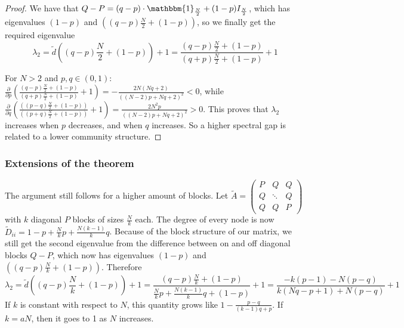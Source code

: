\begin{proof}
We have that $Q - P 
= (q - p)\cdot\mathbbm{1}_{\frac{N}{2}} + (1-p) I_{\frac{N}{2}}$, which has eigenvalues $(1-p)$ and $((q - p)\frac{N}{2}+(1-p))$, so we finally get the required eigenvalue $$\lambda_2 = \tilde{d}((q - p)\frac{N}{2}+(1-p)) + 1
= \frac{(q - p)\frac{N}{2} + (1-p)}{(q + p)\frac{N}{2} + (1-p)} + 1$$

For $N > 2$ and $p,q\in(0,1)$: $\frac{\partial}{\partial p}\left(\frac{(q - p)\frac{N}{2} + (1-p)}{(q + p)\frac{N}{2} + (1-p)} + 1\right) = 
-\frac{2N(Nq + 2)}{\left((N - 2)p + Nq + 2\right)^2} < 0$, while 
$\frac{\partial}{\partial q}\left(\frac{\left(  (p - q)\frac{N}{2} + (1-p)\right)}{\left( (p + q)\frac{ N}{2} + (1-p)\right)} + 1\right) 
= 
\frac{2 N^2 p}{\left((N - 2) p + N q + 2\right)^2} > 0
$. This proves that $\lambda_2$ increases when $p$ decreases, and when $q$ increases. So a higher spectral gap is related to a lower community structure.
\end{proof} 

\subsubsection{Extensions of the theorem}

The argument still follows for a higher amount of blocks. Let $\tilde{A}=\begin{pmatrix}
    P&Q&Q\\Q&\ddots&Q\\Q&Q&P
\end{pmatrix}$ with $k$ diagonal $P$ blocks of sizes $\frac{N}{k}$ each. The degree of every node is now $\tilde{D}_{ii}=1-p+\frac{N}{k}p+\frac{N(k-1)}{k}q$. Because of the block structure of our matrix, we still get the second eigenvalue from the difference between on and off diagonal blocks $Q-P$, which now has eigenvalues $(1-p)$ and $((q-p)\frac{N}{k}+(1-p))$. Therefore
 $$\lambda_2 = \tilde{d}((q - p)\frac{N}{k}+(1-p)) + 1
= \frac{(q - p)\frac{N}{k} + (1-p)}{\frac{N}{k}p+\frac{N(k-1)}{k}q + (1-p)} + 1
=
\frac{-k (p - 1) - N (p - q)}{k (N q - p + 1) + N (p - q)} + 1$$
If $k$ is constant with respect to $N$, this quantity grows like $1-\frac{p-q}{(k-1) q + p}$. If $k=aN$, then it goes to 1 as $N$ increases.

